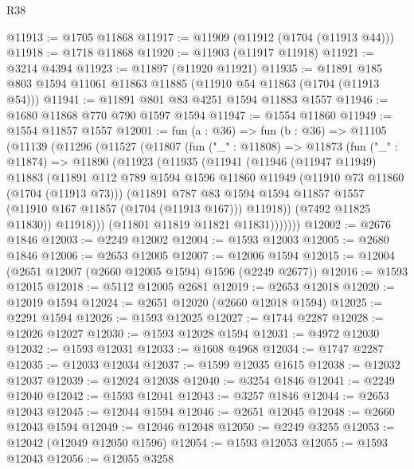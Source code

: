 \begin{lexlean}{R38}
\begin{coremodule}
@11913 := @1705 @11868
@11917 := @11909 (@11912 (@1704 (@11913 @44)))
@11918 := @1718 @11868
@11920 := @11903 (@11917 @11918)
@11921 := @3214 @4394
@11923 := @11897 (@11920 @11921)
@11935 := @11891 @185 @803 @1594 @11061 @11863 @11885 (@11910 @54 @11863 (@1704 (@11913 @54)))
@11941 := @11891 @801 @83 @4251 @1594 @11883 @1557
@11946 := @1680 @11868 @770 @790 @1597 @1594
@11947 := @1554 @11860
@11949 := @1554 @11857 @1557
@12001 := fun (a : @36) =>
  fun (b : @36) =>
  @11105
    (@11139
      (@11296
        (@11527
          (@11807
            (fun ("_" : @11808) =>
            @11873
              (fun ("_" : @11874) =>
              @11890
                (@11923
                  (@11935
                    (@11941
                      (@11946
                        (@11947 @11949)
                        @11883
                        (@11891
                          @112
                          @789
                          @1594
                          @1596
                          @11860
                          @11949
                          (@11910 @73 @11860 (@1704 (@11913 @73)))
                          (@11891
                            @787
                            @83
                            @1594
                            @1594
                            @11857
                            @1557
                            (@11910 @167 @11857 (@1704 (@11913 @167)))
                            @11918))
                        (@7492 @11825 @11830))
                      @11918)))
                (@11801 @11819 @11821 @11831)))))))
@12002 := @2676 @1846
@12003 := @2249 @12002
@12004 := @1593 @12003
@12005 := @2680 @1846
@12006 := @2653 @12005
@12007 := @12006 @1594
@12015 := @12004 (@2651 @12007 (@2660 @12005 @1594) @1596 (@2249 @2677))
@12016 := @1593 @12015
@12018 := @5112 @12005 @2681
@12019 := @2653 @12018
@12020 := @12019 @1594
@12024 := @2651 @12020 (@2660 @12018 @1594)
@12025 := @2291 @1594
@12026 := @1593 @12025
@12027 := @1744 @2287
@12028 := @12026 @12027
@12030 := @1593 @12028 @1594
@12031 := @4972 @12030
@12032 := @1593 @12031
@12033 := @1608 @4968
@12034 := @1747 @2287
@12035 := @12033 @12034
@12037 := @1599 @12035 @1615
@12038 := @12032 @12037
@12039 := @12024 @12038
@12040 := @3254 @1846
@12041 := @2249 @12040
@12042 := @1593 @12041
@12043 := @3257 @1846
@12044 := @2653 @12043
@12045 := @12044 @1594
@12046 := @2651 @12045
@12048 := @2660 @12043 @1594
@12049 := @12046 @12048
@12050 := @2249 @3255
@12053 := @12042 (@12049 @12050 @1596)
@12054 := @1593 @12053
@12055 := @1593 @12043
@12056 := @12055 @3258

\end{coremodule}
\end{lexlean}
